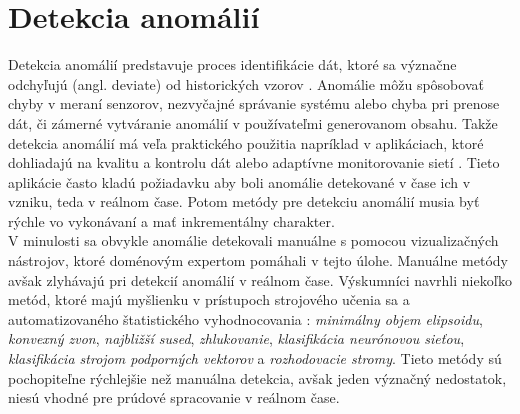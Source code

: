 \section{Detekcia anomálií}
Detekcia anomálií predstavuje proces identifikácie dát, ktoré sa význačne odchyľujú (angl. deviate) od historických vzorov \citep{hodge2004survey}. Anomálie môžu spôsobovať chyby v meraní senzorov, nezvyčajné správanie systému alebo chyba pri prenose dát, či zámerné vytváranie anomálií v používateľmi generovanom obsahu. 
Takže detekcia anomálií má veľa praktického použitia napríklad v aplikáciach, ktoré dohliadajú na kvalitu a kontrolu dát \citep{hill2007real} alebo adaptívne monitorovanie sietí  \citep{hill2010anomaly}. Tieto aplikácie často kladú požiadavku aby boli anomálie detekované v čase ich v vzniku, teda v reálnom čase. Potom metódy pre detekciu anomálií musia byť rýchle vo vykonávaní a mať inkrementálny charakter.\\

V minulosti sa obvykle anomálie detekovali manuálne s pomocou vizualizačných nástrojov, ktoré doménovým expertom pomáhali v tejto úlohe. Manuálne metódy avšak zlyhávajú pri detekcií anomálií v reálnom čase. Výskumníci navrhli niekoľko metód, ktoré majú myšlienku v prístupoch strojového učenia sa a automatizovaného štatistického vyhodnocovania \citep{hill2010anomaly}: \textit{minimálny objem elipsoidu}, \textit{konvexný zvon}, \textit{najbližší sused}, \textit{zhlukovanie}, \textit{klasifikácia neurónovou sieťou}, \textit{klasifikácia strojom podporných vektorov} a \textit{rozhodovacie stromy}. Tieto metódy sú pochopiteľne rýchlejšie než manuálna detekcia, avšak jeden význačný nedostatok, niesú vhodné pre prúdové spracovanie v reálnom čase.

